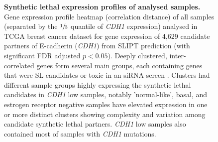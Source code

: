 \begin{figure}[!ht]
  \centering
    \caption[Synthetic lethal expression profiles of analysed samples]{\small \textbf{Synthetic lethal expression profiles of analysed samples.} Gene expression profile heatmap (correlation distance) of all samples (separated by the $\sfrac{1}{3}$ quantile of \textit{CDH1} expression) analysed in TCGA breast cancer dataset for gene expression of 4,629 candidate partners of E-cadherin (\textit{CDH1}) from SLIPT prediction (with significant FDR adjusted $p < 0.05$). Deeply clustered, inter-correlated genes form several main groups, each containing genes that were SL candidates or toxic in an siRNA screen \cite{Telford2015}. Clusters had different sample groups highly expressing the synthetic lethal candidates in \textit{CDH1} low samples, notably 'normal-like', basal, and estrogen receptor negative samples have elevated expression in one or more distinct clusters showing complexity and variation among candidate synthetic lethal partners. \textit{CDH1} low samples also contained most of samples with \textit{CDH1} mutations.
}
\label{fig:slipt_expr_mtSL}
\end{figure}


